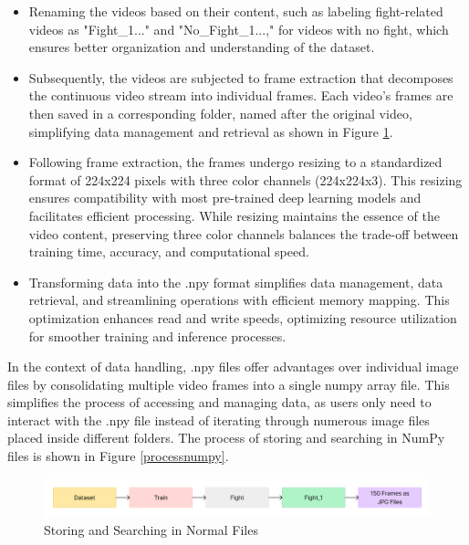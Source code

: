 \begin{itemize}
    \item Renaming the videos based on their content, such as labeling fight-related videos as "Fight\_1..." and "No\_Fight\_1...," for videos with no fight, which ensures better organization and understanding of the dataset. 

    \item Subsequently, the videos are subjected to frame extraction that decomposes the continuous video stream into individual frames. Each video's frames are then saved in a corresponding folder, named after the original video, simplifying data management and retrieval as shown in Figure \ref{processnormal}.
    

    \item Following frame extraction, the frames undergo resizing to a standardized format of 224x224 pixels with three color channels (224x224x3). This resizing ensures compatibility with most pre-trained deep learning models and facilitates efficient processing. While resizing maintains the essence of the video content, preserving three color channels balances the trade-off between training time, accuracy, and computational speed.

    \item Transforming data into the .npy format simplifies data management, data retrieval, and streamlining operations with efficient memory mapping. This optimization enhances read and write speeds, optimizing resource utilization for smoother training and inference processes.
\end{itemize}

    \noindent In the context of data handling, .npy files offer advantages over individual image files by consolidating multiple video frames into a single numpy array file. This simplifies the process of accessing and managing data, as users only need to interact with the .npy file instead of iterating through numerous image files placed inside different folders. The process of storing and searching in NumPy files is shown in Figure \ref{processnumpy}.\\

    \begin{figure}[h!]
        \centering
        \includegraphics[width=1\linewidth]{Images/without npy.png}
        \caption{Storing and Searching in Normal Files}
        \label{processnormal}
    \end{figure}

